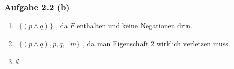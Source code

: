 \subsubsection{Aufgabe 2.2 (b)}
\begin{enumerate}[label=(\arabic*)]
	\item $\begin{aligned}\big\lbrace
		(p\wedge q)
	\big\rbrace\end{aligned}$, da $F$ enthalten und keine Negationen drin.
	\item $\begin{aligned}\big\lbrace
		(p\wedge q), p, q, \neg m
	\big\rbrace\end{aligned}$, da man Eigenschaft 2 wirklich verletzen muss.
	\item $\emptyset$
\end{enumerate}

